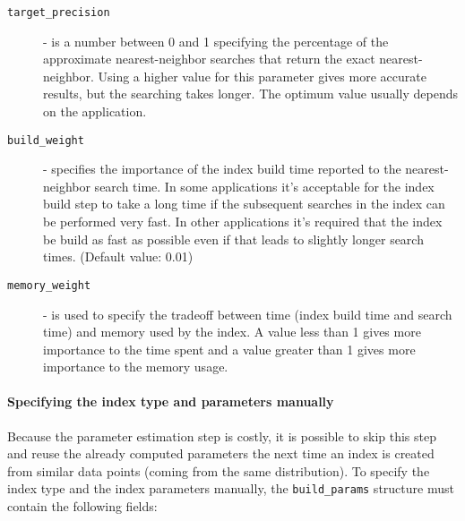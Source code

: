 \documentclass[letter,10pt]{article}
\begin{document}
\begin{description}

\item[\texttt{target\_precision}] - is a number between 0 and 1 specifying the
percentage of the approximate nearest-neighbor searches that return the
exact nearest-neighbor. Using a higher value for this parameter gives
more
accurate results, but the searching takes longer. The optimum value
usually
depends on the application.

\item[\texttt{build\_weight}] - specifies the importance of the
index build time reported to the nearest-neighbor search time. In some
applications it's acceptable for the index build step to take a long time
if the subsequent searches in the index can be performed very fast. In
other applications it's required that the index be build as fast as
possible even if that leads to slightly longer search times. (Default
value: 0.01)

\item[\texttt{memory\_weight}] - is used to specify the tradeoff between
time (index build time and search time) and memory used by the index. A
value less than 1 gives more importance to the time spent and a value
greater than 1 gives more importance to the memory usage.
 \end{description}


\paragraph{Specifying the index type and parameters manually}

Because the parameter estimation step is costly, it is
possible to skip this step and reuse the already computed parameters the
next time an index is created from similar data points (coming from the
same distribution). To specify the index type and the index parameters
manually, the \texttt{build\_params} structure must contain the following
fields:
\end{document}
